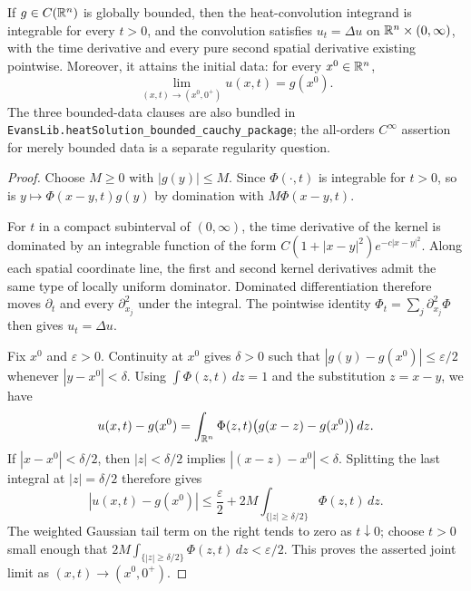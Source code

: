 \begin{lemma}
\label{lem:heat-convolution-bounded-initial-trace}


If $g \in C(\mathbb{R}^n)$ is globally bounded, then the heat-convolution integrand is
integrable for every $t>0$, and the convolution satisfies
$u_t=\Delta u$ on $\mathbb{R}^n\times(0,\infty)$, with the time derivative and every
pure second spatial derivative existing pointwise. Moreover, it attains the initial data:
for every $x^0 \in \mathbb{R}^n$,
\[
\lim_{(x,t)\to(x^0,0^+)} u(x,t)=g(x^0).
\]
The three bounded-data clauses are also bundled in
\texttt{EvansLib.heatSolution\_bounded\_cauchy\_package}; the all-orders
$C^\infty$ assertion for merely bounded data is a separate regularity question.
\end{lemma}
\begin{proof}

Choose $M\geq0$ with $|g(y)|\leq M$. Since $\Phi(\cdot,t)$ is integrable for
$t>0$, so is $y\mapsto\Phi(x-y,t)g(y)$ by domination with
$M\Phi(x-y,t)$.

For $t$ in a compact subinterval of $(0,\infty)$, the time derivative of the
kernel is dominated by an integrable function of the form
$C(1+|x-y|^2)e^{-c|x-y|^2}$. Along each spatial coordinate line, the first and
second kernel derivatives admit the same type of locally uniform dominator.
Dominated differentiation therefore moves $\partial_t$ and every
$\partial_{x_j}^2$ under the integral. The pointwise identity
$\Phi_t=\sum_j\partial_{x_j}^2\Phi$ then gives $u_t=\Delta u$.

Fix $x^0$ and $\varepsilon>0$. Continuity at $x^0$ gives $\delta>0$ such that
$|g(y)-g(x^0)|\leq\varepsilon/2$ whenever $|y-x^0|<\delta$. Using
$\int\Phi(z,t)\,dz=1$ and the substitution $z=x-y$, we have
\[
 u(x,t)-g(x^0)=\int_{\mathbb{R}^n}\Phi(z,t)
       \bigl(g(x-z)-g(x^0)\bigr)\,dz.
\]
If $|x-x^0|<\delta/2$, then $|z|<\delta/2$ implies
$|(x-z)-x^0|<\delta$. Splitting the last integral at $|z|=\delta/2$ therefore
gives
\[
 |u(x,t)-g(x^0)|
 \leq \frac{\varepsilon}{2}
   +2M\int_{\{|z|\geq\delta/2\}}\Phi(z,t)\,dz.
\]
The weighted Gaussian tail term on the right tends to zero as $t\downarrow0$;
choose $t>0$ small enough that
$2M\int_{\{|z|\geq\delta/2\}}\Phi(z,t)\,dz<\varepsilon/2$. This proves the asserted
joint limit as $(x,t)\to(x^0,0^+)$.
\end{proof}

